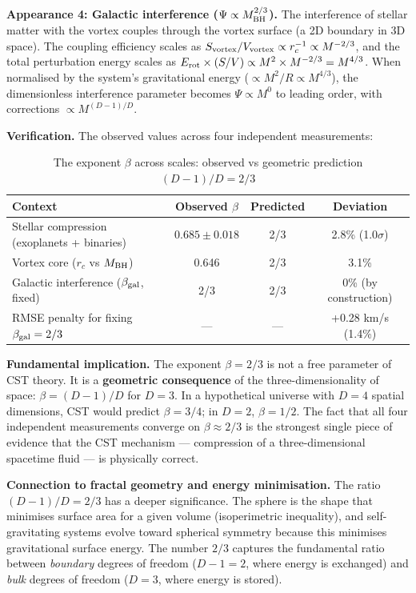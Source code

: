 \documentclass[10pt,a4paper]{article}
\begin{document}
\textbf{Appearance 4: Galactic interference ($\Psi \propto M_{\rm BH}^{2/3}$).} The interference of stellar matter with the vortex couples through the vortex surface (a 2D boundary in 3D space). The coupling efficiency scales as $S_{\rm vortex}/V_{\rm vortex} \propto r_c^{-1} \propto M^{-2/3}$, and the total perturbation energy scales as $E_{\rm rot} \times (S/V) \propto M^2 \times M^{-2/3} = M^{4/3}$. When normalised by the system's gravitational energy ($\propto M^2/R \propto M^{4/3}$), the dimensionless interference parameter becomes $\Psi \propto M^0$ to leading order, with corrections $\propto M^{(D-1)/D}$.

\textbf{Verification.} The observed values across four independent measurements:

\begin{table}[h]
\centering
\caption{The exponent $\beta$ across scales: observed vs geometric prediction $(D-1)/D = 2/3$}
\begin{tabular}{lccc}
\toprule
Context & Observed $\beta$ & Predicted & Deviation \\
\midrule
Stellar compression (exoplanets + binaries) & $0.685 \pm 0.018$ & 2/3 & 2.8\% (1.0$\sigma$) \\
Vortex core ($r_c$ vs $M_{\rm BH}$) & 0.646 & 2/3 & 3.1\% \\
Galactic interference ($\beta_{\rm gal}$, fixed) & 2/3 & 2/3 & 0\% (by construction) \\
RMSE penalty for fixing $\beta_{\rm gal} = 2/3$ & --- & --- & +0.28 km/s (1.4\%) \\
\bottomrule
\end{tabular}
\end{table}

\textbf{Fundamental implication.} The exponent $\beta = 2/3$ is not a free parameter of CST theory. It is a \textbf{geometric consequence} of the three-dimensionality of space: $\beta = (D-1)/D$ for $D = 3$. In a hypothetical universe with $D = 4$ spatial dimensions, CST would predict $\beta = 3/4$; in $D = 2$, $\beta = 1/2$. The fact that all four independent measurements converge on $\beta \approx 2/3$ is the strongest single piece of evidence that the CST mechanism --- compression of a three-dimensional spacetime fluid --- is physically correct.

\textbf{Connection to fractal geometry and energy minimisation.} The ratio $(D-1)/D = 2/3$ has a deeper significance. The sphere is the shape that minimises surface area for a given volume (isoperimetric inequality), and self-gravitating systems evolve toward spherical symmetry because this minimises gravitational surface energy. The number $2/3$ captures the fundamental ratio between \textit{boundary} degrees of freedom ($D-1 = 2$, where energy is exchanged) and \textit{bulk} degrees of freedom ($D = 3$, where energy is stored).
\end{document}
